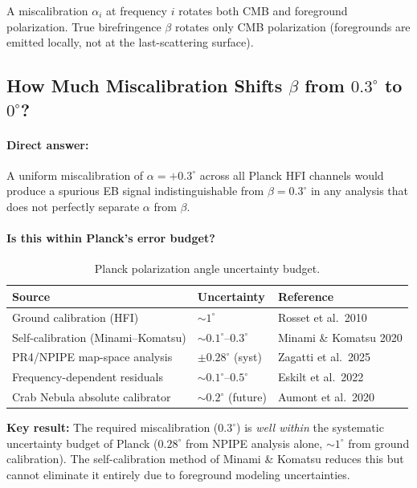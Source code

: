 \documentclass[11pt]{article}
\begin{document}
A miscalibration $\alpha_i$ at frequency $i$ rotates both CMB and
foreground polarization.  True birefringence $\beta$ rotates only
CMB polarization (foregrounds are emitted locally, not at the
last-scattering surface).

\subsection{How Much Miscalibration Shifts $\beta$ from $0.3^\circ$ to $0^\circ$?}

\paragraph{Direct answer:} A uniform miscalibration of
$\alpha = +0.3^\circ$ across all Planck HFI channels would produce
a spurious EB signal indistinguishable from $\beta = 0.3^\circ$ in
any analysis that does not perfectly separate $\alpha$ from $\beta$.

\paragraph{Is this within Planck's error budget?}

\begin{table}[h]
\centering
\caption{Planck polarization angle uncertainty budget.}
\label{tab:planck_angle}
\begin{tabular}{lll}
\toprule
\textbf{Source} & \textbf{Uncertainty} & \textbf{Reference} \\
\midrule
Ground calibration (HFI) & $\sim 1^\circ$ & Rosset et al.\ 2010 \\
Self-calibration (Minami--Komatsu) & $\sim 0.1^\circ$--$0.3^\circ$ & Minami \& Komatsu 2020 \\
PR4/NPIPE map-space analysis & $\pm 0.28^\circ$ (syst) & Zagatti et al.\ 2025 \\
Frequency-dependent residuals & $\sim 0.1^\circ$--$0.5^\circ$ & Eskilt et al.\ 2022 \\
Crab Nebula absolute calibrator & $\sim 0.2^\circ$ (future) & Aumont et al.\ 2020 \\
\bottomrule
\end{tabular}
\end{table}

\textbf{Key result:} The required miscalibration ($0.3^\circ$) is
\emph{well within} the systematic uncertainty budget of Planck
($0.28^\circ$ from NPIPE analysis alone, $\sim 1^\circ$ from ground
calibration).  The self-calibration method of Minami \& Komatsu
reduces this but cannot eliminate it entirely due to foreground
modeling uncertainties.
\end{document}
